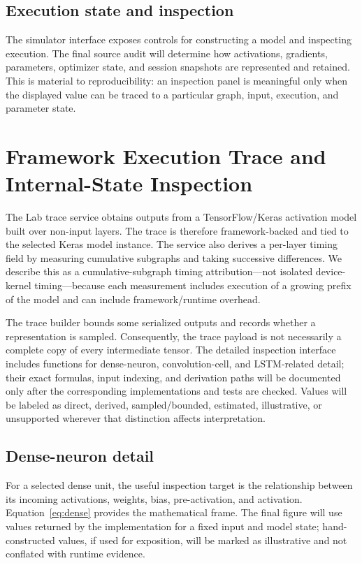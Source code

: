 \documentclass[conference]{IEEEtran}
\begin{document}
\subsection{Execution state and inspection}
The simulator interface exposes controls for constructing a model and inspecting execution. The final source audit will determine how activations, gradients, parameters, optimizer state, and session snapshots are represented and retained. This is material to reproducibility: an inspection panel is meaningful only when the displayed value can be traced to a particular graph, input, execution, and parameter state.

\section{Framework Execution Trace and Internal-State Inspection}
The Lab trace service obtains outputs from a TensorFlow/Keras activation model built over non-input layers. The trace is therefore framework-backed and tied to the selected Keras model instance. The service also derives a per-layer timing field by measuring cumulative subgraphs and taking successive differences. We describe this as a cumulative-subgraph timing attribution—not isolated device-kernel timing—because each measurement includes execution of a growing prefix of the model and can include framework/runtime overhead.

The trace builder bounds some serialized outputs and records whether a representation is sampled. Consequently, the trace payload is not necessarily a complete copy of every intermediate tensor. The detailed inspection interface includes functions for dense-neuron, convolution-cell, and LSTM-related detail; their exact formulas, input indexing, and derivation paths will be documented only after the corresponding implementations and tests are checked. Values will be labeled as direct, derived, sampled/bounded, estimated, illustrative, or unsupported wherever that distinction affects interpretation.

\subsection{Dense-neuron detail}
For a selected dense unit, the useful inspection target is the relationship between its incoming activations, weights, bias, pre-activation, and activation. Equation~\eqref{eq:dense} provides the mathematical frame. The final figure will use values returned by the implementation for a fixed input and model state; hand-constructed values, if used for exposition, will be marked as illustrative and not conflated with runtime evidence.
\end{document}
